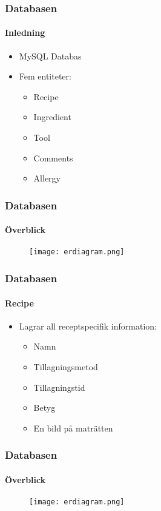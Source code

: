 
\begin{frame}
  \frametitle{Databasen}
  \framesubtitle{Inledning}
  \begin{itemize}
    \item<1-> MySQL Databas
    \item<2-> Fem entiteter:
      \begin{itemize}
      \item<3-> Recipe
      \item<4-> Ingredient
      \item<5-> Tool
      \item<6-> Comments
      \item<7-> Allergy
      \end{itemize}
  \end{itemize}
\end{frame}


\begin{frame}
  \frametitle{Databasen}
  \framesubtitle{Överblick}
  \begin{figure}[H]
        \centering 
        \texttt{[image: erdiagram.png]} 
        \label{fig:erdiagram}
\end{figure}
\end{frame}


\begin{frame}[c]
  \frametitle{Databasen}
  \framesubtitle{Recipe}
  \begin{itemize}
    \item<1-> Lagrar all receptspecifik information:
      \begin{itemize}
        \item Namn 
        \item Tillagningsmetod
        \item Tillagningstid
        \item Betyg
        \item En bild på maträtten
      \end{itemize}
 \end{itemize}
\end{frame}


\begin{frame}[c]
  \frametitle{Databasen}
  \framesubtitle{Överblick}
  \begin{figure}[H]
    \centering 
    \texttt{[image: erdiagram.png]} 
    \label{fig:erdiagram}
  \end{figure}
\end{frame}

